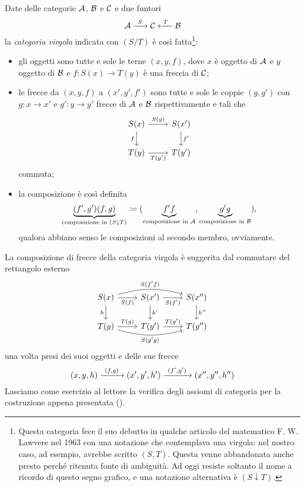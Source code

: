 \begin{costruzione}
Date delle categorie \(\mathcal A\), \(\mathcal B\) e \(\mathcal C\) e due funtori
%
\[\mathcal A \xrightarrow{\ S\ } \mathcal C \xleftarrow{\ T\ } \mathcal B\]
%
la {\em categoria virgola} indicata con \((S / T)\) è così fatta\footnote{Questa categoria fece il suo debutto in qualche articolo del matematico F. W. Lawvere nel 1963 con una notazione che contemplava una virgola: nel nostro caso, ad esempio, avrebbe scritto \((S, T)\). Questa venne abbandonata anche presto perché ritenuta fonte di ambiguità. Ad oggi resiste soltanto il nome a ricordo di questo segno grafico, e una notazione alternativa è \((S \downarrow T)\).}:
\begin{itemize}
\item gli oggetti sono tutte e sole le terne \((x, y, f)\), dove \(x\) è oggetto di \(\mathcal A\) e \(y\) oggetto di \(\mathcal B\) e \(f : S(x) \to T(y)\) è una freccia di \(\mathcal C\);
\item le frecce da \((x, y, f)\) a \((x', y', f')\) sono tutte e sole le coppie \((g, g')\) con \(g : x \to x'\) e \(g' : y \to y'\) frecce di \(\mathcal A\) e \(\mathcal B\) rispettivamente e tali che
\[\begin{tikzcd}
S(x) \ar["S(g)",r] \ar["f",d,swap] & S(x') \ar["f'",d] \\
T(y) \ar["T(g')",r,swap]           & T(y')
\end{tikzcd}\]
commuta;
\item la composizione è così definita
\[\underbrace{(f', g')(f, g)}_{\text{composizione in }(S \downarrow T)} \coloneq (\underbrace{f'f}_{\text{composizione in }\mathcal A}, \underbrace{g'g}_{\text{composizione in }\mathcal B}) ,\]
qualora abbiano senso le composizioni al secondo membro, ovviamente.
\end{itemize}
La composizione di frecce della categoria virgola è suggerita dal commutare del rettangolo esterno
\[\begin{tikzcd}
S(x) \ar["S(f)",r,swap] \ar["S(f'f)",rr, bend left=15] \ar["h",d,swap] &
S(x') \ar["S(f')",r,swap] \ar["h'",d] &
S(x'') \ar["h''",d] \\
T(y) \ar["T(g)",r] \ar["S(g'g)",rr,bend right=15,swap] &
T(y') \ar["T(g')",r] &
T(y'')
\end{tikzcd}\]
una volta presi dei suoi oggetti e delle sue frecce
\[(x, y, h) \xrightarrow{\ (f, g)\ } (x', y', h') \xrightarrow{\ (f',g')\ } (x'', y'', h'')\]
Lasciamo come esercizio al lettore la verifica degli assiomi di categoria per la costruzione appena presentata (\perlettore).
\end{costruzione}

